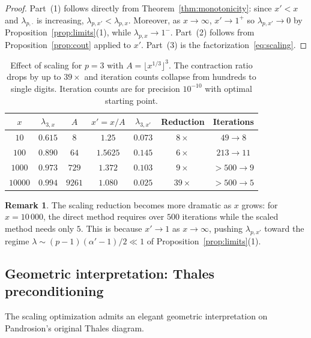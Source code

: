 \documentclass[11pt,a4paper]{article}
\theoremstyle{definition}
\newtheorem{remark}{Remark}[section]
\begin{document}
\begin{proof}
Part~(1) follows directly from Theorem~\ref{thm:monotonicity}: since $x' < x$ and $\lambda_{p,\cdot}$ is increasing, $\lambda_{p,x'} < \lambda_{p,x}$. Moreover, as $x \to \infty$, $x' \to 1^+$ so $\lambda_{p,x'} \to 0$ by Proposition~\ref{prop:limits}(1), while $\lambda_{p,x} \to 1^-$. Part~(2) follows from Proposition~\ref{prop:cout} applied to $x'$. Part~(3) is the factorization~\eqref{eq:scaling}.
\end{proof}

\begin{table}[h]
\centering
\begin{tabular}{ccccccc}
\toprule
$x$ & $\lambda_{3,x}$ & $A$ & $x' = x/A$ & $\lambda_{3,x'}$ & Reduction & Iterations \\
\midrule
$10$ & $0.615$ & $8$ & $1.25$ & $0.073$ & $8\times$ & $49 \to 8$ \\
$100$ & $0.890$ & $64$ & $1.5625$ & $0.145$ & $6\times$ & $213 \to 11$\\
$1000$ & $0.973$ & $729$ & $1.372$ & $0.103$ & $9\times$ & $>500 \to 9$ \\
$10000$ & $0.994$ & $9261$ & $1.080$ & $0.025$ & $39\times$ & $>500 \to 5$ \\
\bottomrule
\end{tabular}
\caption{Effect of scaling for $p = 3$ with $A = \lfloor x^{1/3} \rfloor^3$. The contraction ratio drops by up to $39\times$ and iteration counts collapse from hundreds to single digits. Iteration counts are for precision $10^{-10}$ with optimal starting point.}
\end{table}

\begin{remark}
The scaling reduction becomes more dramatic as $x$ grows: for $x = 10\,000$, the direct method requires over $500$ iterations while the scaled method needs only $5$. This is because $x' \to 1$ as $x \to \infty$, pushing $\lambda_{p,x'}$ toward the regime $\lambda \sim (p-1)(\alpha'-1)/2 \ll 1$ of Proposition~\ref{prop:limits}(1).
\end{remark}

\subsection{Geometric interpretation: Thales preconditioning}
\label{subsec:thales_preconditioning}

The scaling optimization admits an elegant geometric interpretation on Pandrosion's original Thales diagram.
\end{document}
